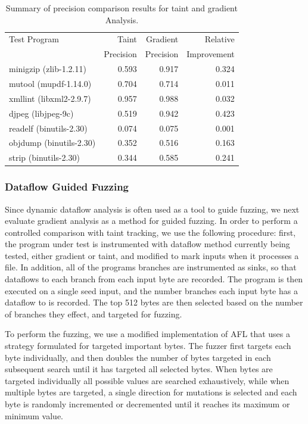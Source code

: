 \begin{table}
\centering
  \begin{tabular}{lrrr} 
 \toprule
    Test Program & Taint & Gradient & Relative \\ 
                 & Precision & Precision & Improvement \\ 
 \midrule
   minigzip (zlib-1.2.11)  & 0.593     & 0.917 & 0.324\\ 
   mutool (mupdf-1.14.0)   & 0.704     & 0.714 & 0.011\\
   xmllint (libxml2-2.9.7) & 0.957     & 0.988 & 0.032\\
   djpeg (libjpeg-9c)      & 0.519     & 0.942 & 0.423\\  
   readelf (binutils-2.30) & 0.074     & 0.075 & 0.001\\  
   objdump (binutils-2.30) & 0.352     & 0.516 & 0.163\\  
   strip   (binutils-2.30) & 0.344     & 0.585 & 0.241\\  
 \bottomrule
 \end{tabular}
 \caption{\label{tab:precision_comp}Summary of precision comparison results for taint and gradient Analysis.}
\end{table}



\subsubsection{Dataflow Guided Fuzzing}

Since dynamic dataflow analysis is often used as a tool to guide fuzzing, we next evaluate gradient analysis as a method for guided fuzzing. In order to perform a controlled comparison with taint tracking, we use the following procedure: first, the program under test is instrumented with dataflow method currently being tested, either gradient or taint, and modified to mark inputs when it processes a file. In addition, all of the programs branches are instrumented as sinks, so that dataflows to each branch from each input byte are recorded. The program is then executed on a single seed input, and the number branches each input byte has a dataflow to is recorded. The top 512 bytes are then selected based on the number of branches they effect, and targeted for fuzzing. 

To perform the fuzzing, we use a modified implementation of AFL that uses a strategy formulated for targeted important bytes. The fuzzer first targets each byte individually, and then doubles the number of bytes targeted in each subsequent search until it has targeted all selected bytes. When bytes are targeted individually all possible values are searched exhaustively, while when multiple bytes are targeted, a single direction for mutations is selected and each byte is randomly incremented or decremented until it reaches its maximum or minimum value. 

